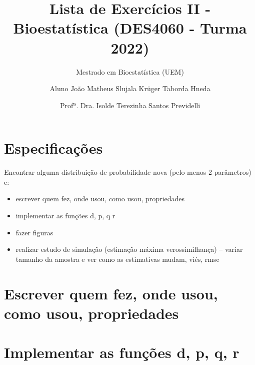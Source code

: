 \documentclass[
]{article}
\title{Lista de Exercícios II - Bioestatística (DES4060 - Turma 2022)}
\author{Mestrado em Bioestatística (UEM) \and Aluno João Matheus Slujala
Krüger Taborda Hneda \and Profª. Dra. Isolde Terezinha Santos
Previdelli}
\date{}
\providecommand{\tightlist}{%
  \setlength{\itemsep}{0pt}\setlength{\parskip}{0pt}}
\begin{document}
\maketitle

\renewcommand*\contentsname{Sumário}
{
\setcounter{tocdepth}{5}
\tableofcontents
}
\newpage

\hypertarget{especificauxe7uxf5es}{%
\section{Especificações}\label{especificauxe7uxf5es}}

Encontrar alguma distribuição de probabilidade nova (pelo menos 2
parâmetros) e:

\begin{itemize}
\tightlist
\item
  escrever quem fez, onde usou, como usou, propriedades
\item
  implementar as funções d, p, q r
\item
  fazer figuras
\item
  realizar estudo de simulação (estimação máxima verossimilhança) --
  variar tamanho da amostra e ver como as estimativas mudam, viés, rmse
\end{itemize}

\hypertarget{escrever-quem-fez-onde-usou-como-usou-propriedades}{%
\section{Escrever quem fez, onde usou, como usou,
propriedades}\label{escrever-quem-fez-onde-usou-como-usou-propriedades}}

\hypertarget{implementar-as-funuxe7uxf5es-d-p-q-r}{%
\section{Implementar as funções d, p, q,
r}\label{implementar-as-funuxe7uxf5es-d-p-q-r}}
\end{document}
